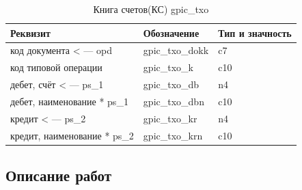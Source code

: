 \begin{table}[h!]
    \centering
    \scriptsize
    \caption{Книга счетов(КС) gpic\_txo}
    \begin{tabular}{|l|l|l|} 

\hline
\textbf{Реквизит}               &\textbf{Обозначение}   &\textbf{Тип и значность}   \\ \hline
код документа < --- opd         &gpic\_txo\_dokk        &c7                         \\ \hline
код типовой операции            &gpic\_txo\_k           &c10                        \\ \hline
дебет, счёт < --- ps\_1         &gpic\_txo\_db          &n4                         \\ \hline
дебет, наименование * ps\_1     &gpic\_txo\_dbn         &c10                        \\ \hline
кредит < --- ps\_2              &gpic\_txo\_kr          &n4                         \\ \hline
кредит, наименование * ps\_2    &gpic\_txo\_krn         &c10                        \\ \hline

    \end{tabular}
\end{table}

\newpage

\subsection{Описание работ}

